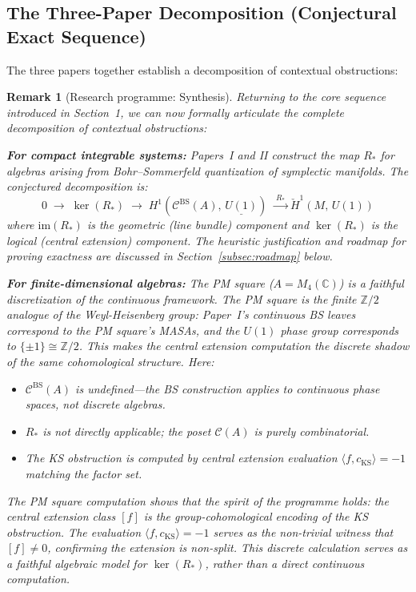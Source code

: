 \documentclass[11pt]{article}
\newtheorem{remark}[theorem]{Remark}
\begin{document}
\subsection{The Three-Paper Decomposition (Conjectural Exact Sequence)}

The three papers together establish a decomposition of contextual
obstructions:

\begin{remark}[Research programme: Synthesis]
\label{conj:synthesis}
Returning to the core sequence introduced in Section~1, we can now formally
articulate the complete decomposition of contextual obstructions:

\textbf{For compact integrable systems:} Papers~I and II construct the map
$R_*$ for algebras arising from Bohr--Sommerfeld quantization of symplectic
manifolds. The conjectured decomposition is:
\[
  0 \;\longrightarrow\; \ker(R_*)
  \;\longrightarrow\; H^1(\mathcal{C}^{\mathrm{BS}}(A),\, \underline{U(1)})
  \;\xrightarrow{\;R_*\;}
  \check{H}^1(M,\, U(1))
\]
where $\mathrm{im}(R_*)$ is the geometric (line bundle) component and
$\ker(R_*)$ is the logical (central extension) component.
The heuristic justification and roadmap for proving exactness are
discussed in Section~\ref{subsec:roadmap} below.

\textbf{For finite-dimensional algebras:} The PM square ($A = M_4(\mathbb{C})$)
is a \emph{faithful discretization} of the continuous framework.
The PM square is the finite $\mathbb{Z}/2$ analogue of the Weyl-Heisenberg group:
Paper~I's continuous BS leaves correspond to the PM square's MASAs,
and the $U(1)$ phase group corresponds to $\{\pm 1\} \cong \mathbb{Z}/2$.
This makes the central extension computation the discrete shadow of
the same cohomological structure. Here:
\begin{itemize}
  \item $\mathcal{C}^{\mathrm{BS}}(A)$ is undefined---the BS construction
        applies to continuous phase spaces, not discrete algebras.
  \item $R_*$ is not directly applicable; the poset $\mathcal{C}(A)$ is
        purely combinatorial.
  \item The KS obstruction is computed by central extension evaluation
        $\langle f, c_{\mathrm{KS}} \rangle = -1$ matching the
        factor set.
\end{itemize}

The PM square computation shows that the \emph{spirit} of the programme
holds: the central extension class $[f]$ is the group-cohomological encoding
of the KS obstruction. The evaluation $\langle f, c_{\mathrm{KS}} \rangle = -1$
serves as the non-trivial \emph{witness} that $[f] \neq 0$, confirming the extension
is non-split. This discrete calculation serves as a faithful algebraic model
for $\ker(R_*)$, rather than a direct continuous computation.
\end{remark}
\end{document}
